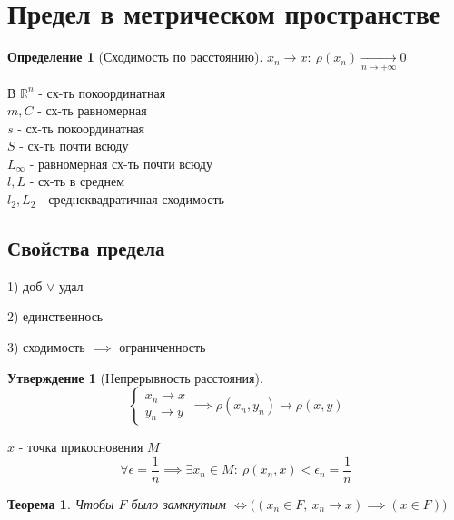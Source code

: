 \documentclass[a4paper]{article}
\newtheorem*{theorem}{Теорема}
\newtheorem*{statement}{Утверждение}
\theoremstyle{definition}
\newtheorem*{definition}{Определение}
\theoremstyle{remark}
\begin{document}
\section*{\centering Предел в метрическом пространстве}

\begin{tcolorbox}
    \begin{definition}[Сходимость по расстоянию]
        $ x_n \to x: \ \rho(x_n) \xrightarrow[n \to +\infty]{} 0 $ 
    \end{definition}
\end{tcolorbox}

В $ \mathbb{R}^{n} $ - сх-ть покоординатная\\
$ m,C $ - сх-ть равномерная\\
$ s $ - сх-ть покоординатная\\
$ S $ - сх-ть почти всюду\\
$ L_{\infty} $ - равномерная сх-ть почти всюду\\
$ l, L $ - сх-ть в среднем\\
$ l_2, L_2 $ - среднеквадратичная сходимость

\subsection*{Свойства предела}

1) доб $ \lor $ удал 

2) единственнось

3) сходимость $ \implies $ ограниченность

\begin{tcolorbox}
    \begin{statement}[Непрерывность расстояния]
        \[
            \begin{cases}
                x_n \to x\\
                y_n \to y
            \end{cases} \implies
            \rho(x_n, y_n) \to \rho(x,y)
        \]
    \end{statement}
\end{tcolorbox}

$ x $ - точка прикосновения $ M $ 
\[
    \forall \epsilon = \frac{1}{n} \implies \exists x_n \in M: \ \rho(x_n,x) <
    \epsilon_n = \frac{1}{n} 
\]

\begin{tcolorbox}
\begin{theorem}
    Чтобы $ F $ было замкнутым $ \iff \Big((x_n \in F, \ x_n \to x) \implies (x \in
    F)\Big)$ 
\end{theorem}
\end{tcolorbox}
\end{document}
